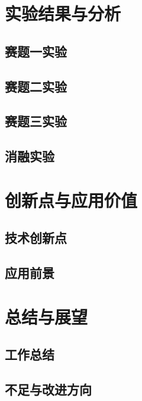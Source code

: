 \documentclass[openany,12pt,UTF8]{ctexbook}
\begin{document}
\chapter{实验结果与分析}

\section{赛题一实验}


\section{赛题二实验}


\section{赛题三实验}


\section{消融实验}


\chapter{创新点与应用价值}

\section{技术创新点}


\section{应用前景}


\chapter{总结与展望}

\section{工作总结}

\section{不足与改进方向}

\end{document}
